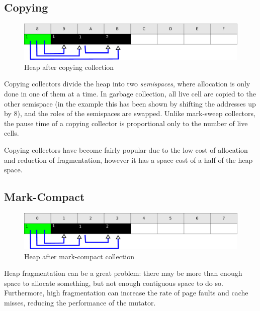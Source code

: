 \subsection{Copying}
\label{sec:lit-gc-copying}

\begin{figure}[h]
  \centering
  \includegraphics[width=\textwidth]{lit-gc-copying}
  \caption{Heap after copying collection}
  \label{fig:lit-gc-copying}
\end{figure}

Copying collectors divide the heap into two \textit{semispaces}, where
allocation is only done in one of them at a time. In garbage
collection, all live cell are copied to the other semispace (in
the example this has been shown by shifting the addresses up by 8),
and the roles of the semispaces are swapped\cite{Fenichel69}. Unlike
mark-sweep collectors, the pause time of a copying collector is
proportional only to the number of live cells.

Copying collectors have become fairly popular due to the low cost of
allocation and reduction of fragmentation, however it has a space cost
of a half of the heap space\cite{GarbageCollection}.

\subsection{Mark-Compact}
\label{sec:lit-gc-markcompact}

\begin{figure}[h]
  \centering
  \includegraphics[width=\textwidth]{lit-gc-markcompact}
  \caption{Heap after mark-compact collection}
  \label{fig:lit-gc-markcompact}
\end{figure}

Heap fragmentation can be a great problem: there may be more
than enough space to allocate something, but not enough contiguous
space to do so. Furthermore, high fragmentation can increase the rate
of page faults and cache misses, reducing the performance of the
mutator.

